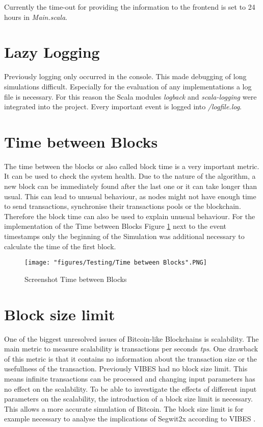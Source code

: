 Currently the time-out for providing the information to the frontend is set to 24 hours in \textit{Main.scala}.

\section{Lazy Logging}
Previously logging only occurred in the console. This made debugging of long simulations difficult. Especially for the evaluation of any implementations a log file is necessary. For this reason the Scala modules \textit{logback} and \textit{scala-logging} were integrated into the project. Every important event is logged into \textit{/logfile.log}.

\section{Time between Blocks}
The time between the blocks or also called block time is a very important metric. It can be used to check the system health. Due to the nature of the algorithm, a new block can be immediately found after the last one or it can take longer than usual. This can lead to unusual behaviour, as nodes might not have enough time to send transactions, synchronise their transactions pools or the blockchain. Therefore the block time can also be used to explain unusual behaviour. For the implementation of the Time between Blocks Figure \ref{fig:timeBetweenBlocks} next to the event timestamps only the beginning of the Simulation was additional necessary to calculate the time of the first block.

\begin{figure}
\centering
\texttt{[image: "figures/Testing/Time between Blocks".PNG]}
\caption{Screenshot Time between Blocks
\label{fig:timeBetweenBlocks}}
\end{figure}

\section{Block size limit \label{subsection:blocksizelimit}}
One of the biggest unresolved issues of Bitcoin-like Blockchains is scalability. The main metric to measure scalability is transactions per seconds \textit{tps}. One drawback of this metric is that it contains no information about the transaction size or the usefullness of the transaction. Previously VIBES had no block size limit. This means infinite transactions can be processed and changing input parameters has no effect on the scalability. To be able to investigate the effects of different input parameters on the scalability, the introduction of a block size limit is necessary. This allows a more accurate simulation of Bitcoin. The block size limit is for example necessary to analyse the implications of Segwit2x according to VIBES \cite{vibes}.

